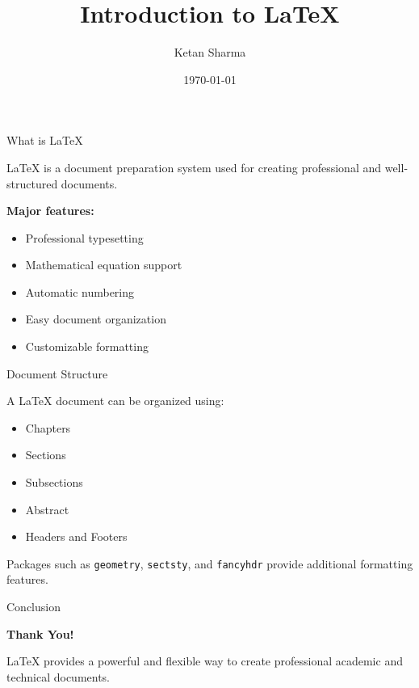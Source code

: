 \documentclass{beamer}
\title{\textbf{Introduction to LaTeX}}
\author{Ketan Sharma}
\institute{MNIT Jaipur}
\date{\today}
\begin{document}
	
	\begin{frame}
		\titlepage
	\end{frame}
	
	\begin{frame}{What is LaTeX}
		
		LaTeX is a document preparation system used for creating
		professional and well-structured documents.
		
		\vspace{0.5cm}
		
		\textbf{Major features:}
		
		\begin{itemize}
			\item Professional typesetting
			\item Mathematical equation support
			\item Automatic numbering
			\item Easy document organization
			\item Customizable formatting
		\end{itemize}
		
	\end{frame}
	
	\begin{frame}{Document Structure}
		
		A LaTeX document can be organized using:
		
		\begin{itemize}
			\item Chapters
			\item Sections
			\item Subsections
			\item Abstract
			\item Headers and Footers
		\end{itemize}
		
		\vspace{0.5cm}
		
		Packages such as \texttt{geometry}, \texttt{sectsty},
		and \texttt{fancyhdr} provide additional formatting features.
		
	\end{frame}
	
	\begin{frame}{Conclusion}
		
		\begin{center}
			\Large\textbf{Thank You!}
			
			\vspace{1cm}
			
			\normalsize
			LaTeX provides a powerful and flexible way to create
			professional academic and technical documents.
		\end{center}
		
	\end{frame}
	
\end{document}
